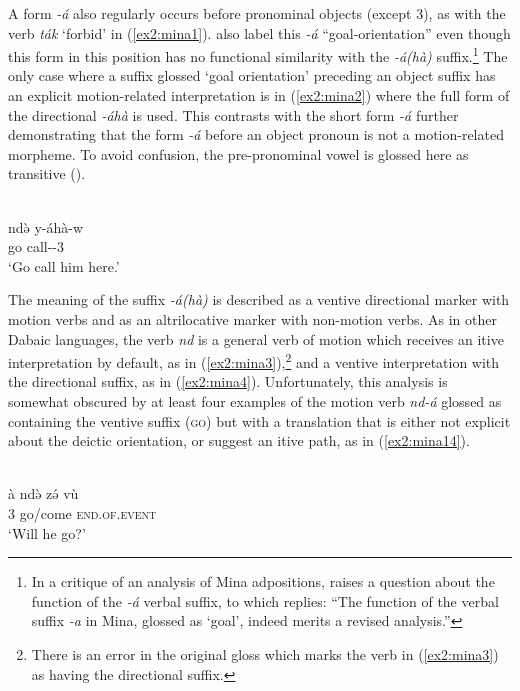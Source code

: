 A form \textit{-á} also regularly occurs before pronominal objects (except 3), as with the verb \textit{ták} `forbid' in (\ref{ex2:mina1}). \citet[97]{frajzyngierGrammarMina2005} also label this \textit{-á} ``goal-orientation'' even though this form in this position has no functional similarity with the \textit{-á(hà)} suffix.\footnote{In a critique of an analysis of Mina adpositions, \citet[455]{hellwigAdpositionsTheirDistribution2022} raises a question about the function of the \textit{-á} verbal suffix, to which \citet[461]{frajzyngierMeaningEncodedGrammatical2022} replies: ``The function of the verbal suffix \textit{-a} in Mina, glossed as `goal', indeed merits a revised analysis.''} The only case where a suffix glossed ‘goal orientation’ preceding an object suffix has an explicit motion-related interpretation is in (\ref{ex2:mina2}) where the full form of the directional \textit{-áhà} is used. This contrasts with the short form \textit{-á} further demonstrating that the form \textit{-á} before an object pronoun is not a motion-related morpheme. To avoid confusion, the pre-pronominal vowel is glossed here as transitive ().

\ea\label{ex2:mina2}
 \\
\gll  ndə̀	y-áhà-w \\
go	call--3 \\
\glt `Go call him here.'
\z 

The meaning of the suffix \textit{-á(hà)} is described as a ventive directional marker with motion verbs and as an altrilocative marker with non-motion verbs. As in other Dabaic languages, the verb \textit{nd} is a general verb of motion which receives an itive interpretation by default, as in (\ref{ex2:mina3}),\footnote{There is an error in the original gloss which marks the verb in (\ref{ex2:mina3}) as having the directional suffix.} and a ventive interpretation with the directional suffix, as in (\ref{ex2:mina4}). Unfortunately, this analysis is somewhat obscured by at least four examples of the motion verb \textit{nd-á} glossed as containing the ventive suffix (\textsc{go}) but with a translation that is either not explicit about the deictic orientation, or suggest an itive path, as in (\ref{ex2:mina14}).

\ea\label{ex2:mina3}
 \\
\gll  à	ndə̀	zə́	vù \\
3	go/come	\textsc{end.of.event}	 \\
\glt `Will he go?'


